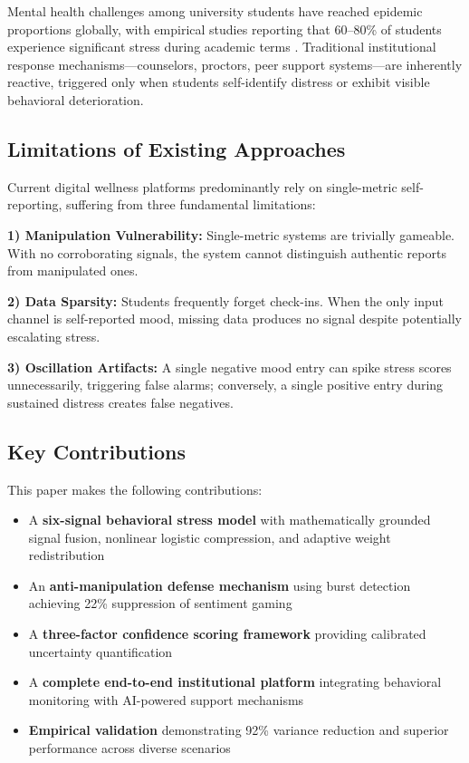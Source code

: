 \documentclass[conference]{IEEEtran}
\begin{document}
Mental health challenges among university students have reached epidemic proportions globally, with empirical studies reporting that 60--80\% of students experience significant stress during academic terms \cite{beiter2015}. Traditional institutional response mechanisms---counselors, proctors, peer support systems---are inherently reactive, triggered only when students self-identify distress or exhibit visible behavioral deterioration.

\subsection{Limitations of Existing Approaches}

Current digital wellness platforms predominantly rely on single-metric self-reporting, suffering from three fundamental limitations:

\textbf{1) Manipulation Vulnerability:} Single-metric systems are trivially gameable. With no corroborating signals, the system cannot distinguish authentic reports from manipulated ones.

\textbf{2) Data Sparsity:} Students frequently forget check-ins. When the only input channel is self-reported mood, missing data produces no signal despite potentially escalating stress.

\textbf{3) Oscillation Artifacts:} A single negative mood entry can spike stress scores unnecessarily, triggering false alarms; conversely, a single positive entry during sustained distress creates false negatives.

\subsection{Key Contributions}

This paper makes the following contributions:
\begin{itemize}
    \item A \textbf{six-signal behavioral stress model} with mathematically grounded signal fusion, nonlinear logistic compression, and adaptive weight redistribution
    \item An \textbf{anti-manipulation defense mechanism} using burst detection achieving 22\% suppression of sentiment gaming
    \item A \textbf{three-factor confidence scoring framework} providing calibrated uncertainty quantification
    \item A \textbf{complete end-to-end institutional platform} integrating behavioral monitoring with AI-powered support mechanisms
    \item \textbf{Empirical validation} demonstrating 92\% variance reduction and superior performance across diverse scenarios
\end{itemize}
\end{document}
